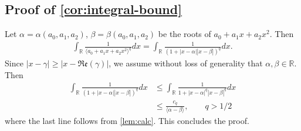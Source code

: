 \documentclass[12pt,reqno]{amsart}
\numberwithin{equation}{section}  %
\newcommand{\rr}{\mathbb{R}}
\begin{document}
\begin{appendices}
\subsection{Proof of \cref{cor:integral-bound}}
\label{ssec:pf-int-bound}
%
Let $\alpha = \alpha(a_{0}, a_{1}, a_{2})$, $\beta = \beta(a_{0}, a_{1}, a_{2})$
be the roots of $a_{0} + a_{1}x + a_{2}x^{2}$. Then
%
%
\begin{equation*}
\begin{split}
  \int_{\rr} \frac{1}{\langle a_{0} + a_{1}x + a_{2}x^{2} \rangle ^{q}} dx =
  \int_{\rr} \frac{1}{(1 + | x -\alpha | | x- \beta |)^{q}} dx.
\end{split}
\end{equation*}
%
%
Since $| x - \gamma | \ge | x - \mathfrak{Re}(\gamma) |$, we assume without loss
of generality that $ \alpha, \beta \in \rr$. Then
%
%
\begin{equation*}
\begin{split}
  \int_{\rr} \frac{1}{(1 + | x -\alpha | | x- \beta |)^{q}} dx
  & \le \int_{\rr} \frac{1}{1 + | x- \alpha |^{q} | x - \beta |^{q}} dx
  \\
  & \le \frac{c_{q}}{\langle \alpha - \beta \rangle }, \qquad q > 1/2
\end{split}
\end{equation*}
%
%
where the last line follows from \cref{lem:calc}. This concludes the proof.
\qquad \qedsymbol
%

\end{appendices}
\end{document}
